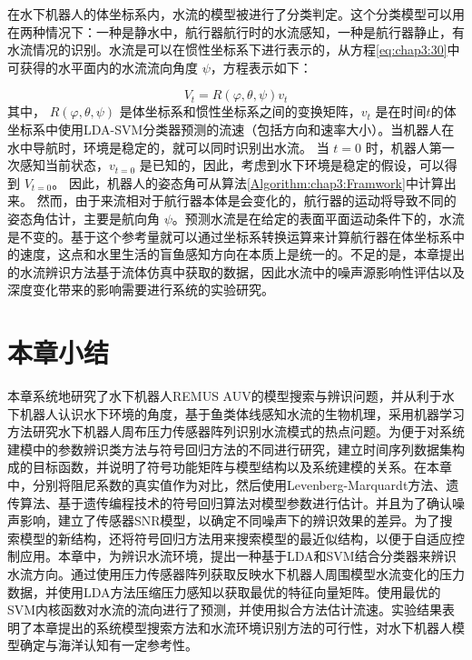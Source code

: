 在水下机器人的体坐标系内，水流的模型被进行了分类判定。这个分类模型可以用在两种情况下：一种是静水中，航行器航行时的水流感知，一种是航行器静止，有水流情况的识别。水流是可以在惯性坐标系下进行表示的，从方程\ref{eq:chap3:30}中可获得的水平面内的水流流向角度 $\psi$，方程表示如下：

\begin{equation}
\label{eq:chap3:30}
V_t = R\left (  \varphi,\theta,\psi \right )v_t
\end{equation}
其中， $R\left ( \varphi,\theta,\psi \right )$ 是体坐标系和惯性坐标系之间的变换矩阵，$v_t$ 是在时间$t$的体坐标系中使用LDA-SVM分类器预测的流速（包括方向和速率大小）。当机器人在水中导航时，环境是稳定的，就可以同时识别出水流。 当 $t=0$ 时，机器人第一次感知当前状态，$v_{t=0}$ 是已知的，因此，考虑到水下环境是稳定的假设，可以得到 $V_{t=0}$。 因此，机器人的姿态角可从算法\ref{Algorithm:chap3:Framwork}中计算出来。 然而，由于来流相对于航行器本体是会变化的，航行器的运动将导致不同的姿态角估计，主要是航向角 $\psi$。预测水流是在给定的表面平面运动条件下的，水流是不变的。基于这个参考量就可以通过坐标系转换运算来计算航行器在体坐标系中的速度，这点和水里生活的盲鱼感知方向在本质上是统一的。不足的是，本章提出的水流辨识方法基于流体仿真中获取的数据，因此水流中的噪声源影响性评估以及深度变化带来的影响需要进行系统的实验研究。


\section{本章小结 }

本章系统地研究了水下机器人REMUS AUV的模型搜索与辨识问题，并从利于水下机器人认识水下环境的角度，基于鱼类体线感知水流的生物机理，采用机器学习方法研究水下机器人周布压力传感器阵列识别水流模式的热点问题。为便于对系统建模中的参数辨识类方法与符号回归方法的不同进行研究，建立时间序列数据集构成的目标函数，并说明了符号功能矩阵与模型结构以及系统建模的关系。在本章中，分别将阻尼系数的真实值作为对比，然后使用Levenberg-Marquardt方法、遗传算法、基于遗传编程技术的符号回归算法对模型参数进行估计。并且为了确认噪声影响，建立了传感器SNR模型，以确定不同噪声下的辨识效果的差异。为了搜索模型的新结构，还将符号回归方法用来搜索模型的最近似结构，以便于自适应控制应用。本章中，为辨识水流环境，提出一种基于LDA和SVM结合分类器来辨识水流方向。通过使用压力传感器阵列获取反映水下机器人周围模型水流变化的压力数据，并使用LDA方法压缩压力感知以获取最优的特征向量矩阵。使用最优的SVM内核函数对水流的流向进行了预测，并使用拟合方法估计流速。实验结果表明了本章提出的系统模型搜索方法和水流环境识别方法的可行性，对水下机器人模型确定与海洋认知有一定参考性。
